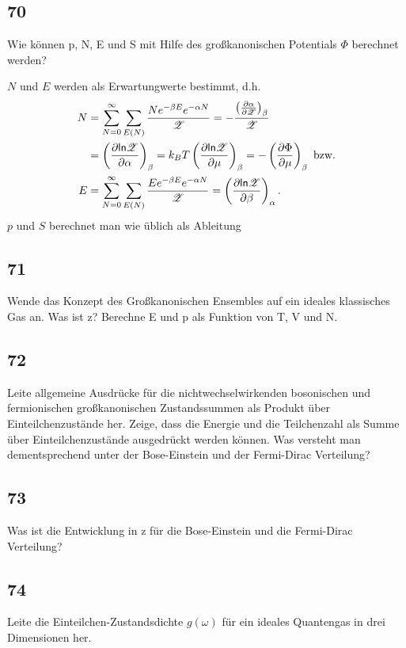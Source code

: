 \subsection{70}
\begin{myfrag}
Wie können p, N, E und S mit Hilfe des großkanonischen Potentials $\Phi$
berechnet werden?
\end{myfrag}
$N$ und $E$ werden als Erwartungwerte bestimmt, d.h.
\begin{align}
	N&=\sum\limits_{N=0}^\infty\sum\limits_{E(N)}\frac{Ne^{-\beta E}e^{-\alpha N}}{\mathscr{Z}}=-\frac{\left(\frac{\partial \alpha}{\partial \mathscr{Z}}\right)_{\beta}}{\mathscr{Z}}\nonumber\\
	&=\left(\frac{\partial \mathsf{ln} \mathscr{Z}}{\partial \alpha}\right)_{\beta}=k_BT\left(\frac{\partial \mathsf{ln} \mathscr{Z}}{\partial \mu}\right)_{\beta}=-\left(\frac{\partial \Phi}{\partial \mu}\right)_{\beta}\text{ bzw.}\\
	E&=\sum\limits_{N=0}^\infty\sum\limits_{E(N)}\frac{Ee^{-\beta E}e^{-\alpha N}}{\mathscr{Z}}=\left(\frac{\partial \mathsf{ln} \mathscr{Z}}{\partial \beta}\right)_{\alpha}.
\end{align}
$p$ und $S$ berechnet man wie üblich als Ableitung
\subsection{71}
\begin{myfrag}
Wende das Konzept des Großkanonischen Ensembles auf ein ideales
klassisches Gas an. Was ist z? Berechne E und p als Funktion von T, V und
N.
\end{myfrag}
\subsection{72}
\begin{myfrag}
Leite allgemeine Ausdrücke für die nichtwechselwirkenden bosonischen und
fermionischen großkanonischen Zustandssummen als Produkt über Einteilchenzustände
her. Zeige, dass die Energie und die Teilchenzahl als
Summe über Einteilchenzustände ausgedrückt werden können. Was versteht
man dementsprechend unter der Bose-Einstein und der Fermi-Dirac
Verteilung?
\end{myfrag}
\subsection{73}
\begin{myfrag}
Was ist die Entwicklung in z für die Bose-Einstein und die Fermi-Dirac
Verteilung?
\end{myfrag}
\subsection{74}
\begin{myfrag}
Leite die Einteilchen-Zustandsdichte $g(\omega )$ für ein ideales Quantengas in drei
Dimensionen her.
\end{myfrag}
